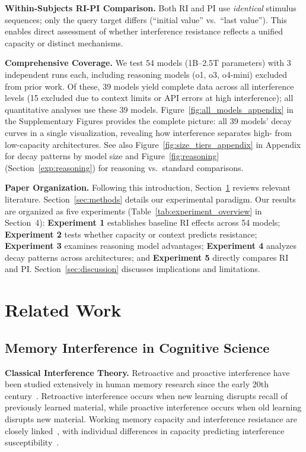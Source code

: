 \documentclass{article}
\begin{document}
\textbf{Within-Subjects RI-PI Comparison.} Both RI and PI use \textit{identical} stimulus sequences; only the query target differs (``initial value'' vs.\ ``last value''). This enables direct assessment of whether interference resistance reflects a unified capacity or distinct mechanisms.

\textbf{Comprehensive Coverage.} We test 54 models (1B--2.5T parameters) with 3 independent runs each, including reasoning models (o1, o3, o4-mini) excluded from prior work. Of these, 39 models yield complete data across all interference levels (15 excluded due to context limits or API errors at high interference); all quantitative analyses use these 39 models. Figure~\ref{fig:all_models_appendix} in the Supplementary Figures provides the complete picture: all 39 models' decay curves in a single visualization, revealing how interference separates high- from low-capacity architectures. See also Figure~\ref{fig:size_tiers_appendix} in Appendix for decay patterns by model size and Figure~\ref{fig:reasoning} (Section~\ref{exp:reasoning}) for reasoning vs.\ standard comparisons.

\textbf{Paper Organization.} Following this introduction, Section~\ref{sec:related} reviews relevant literature. Section~\ref{sec:methods} details our experimental paradigm. Our results are organized as five experiments (Table~\ref{tab:experiment_overview} in Section~4): \textbf{Experiment 1} establishes baseline RI effects across 54 models; \textbf{Experiment 2} tests whether capacity or context predicts resistance; \textbf{Experiment 3} examines reasoning model advantages; \textbf{Experiment 4} analyzes decay patterns across architectures; and \textbf{Experiment 5} directly compares RI and PI. Section~\ref{sec:discussion} discusses implications and limitations.

\section{Related Work}
\label{sec:related}

\subsection{Memory Interference in Cognitive Science}

\textbf{Classical Interference Theory.} Retroactive and proactive interference have been studied extensively in human memory research since the early 20th century~\citep{jenkins1924obliviscence, underwood1957interference}. Retroactive interference occurs when new learning disrupts recall of previously learned material, while proactive interference occurs when old learning disrupts new material. Working memory capacity and interference resistance are closely linked~\citep{baddeley1974working, cowan2001capacity}, with individual differences in capacity predicting interference susceptibility~\citep{engle2002working}.
\end{document}
